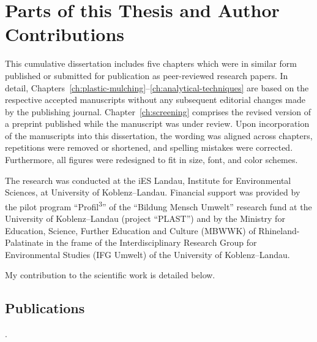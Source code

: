 
\chapter{Parts of this Thesis and Author Contributions}
\label{ch:author-contributions}

This cumulative dissertation includes five chapters which were in similar form published or submitted for publication as peer-reviewed research papers.
In detail, Chapters~\ref{ch:plastic-mulching}--\ref{ch:analytical-techniques} are based on the respective accepted manuscripts without any subsequent editorial changes made by the publishing journal. Chapter~\ref{ch:screening} comprises the revised version of a preprint published while the manuscript was under review.
Upon incorporation of the manuscripts into this dissertation, the wording was aligned across chapters, repetitions were removed or shortened, and spelling mistakes were corrected. Furthermore, all figures were redesigned to fit in size, font, and color schemes.

The research was conducted at the iES Landau, Institute for Environmental Sciences, at University of Koblenz--Landau. Financial support was provided by the pilot program ``Profil\textsuperscript{3}'' of the ``\foreignlanguage{ngerman}{Bildung Mensch Umwelt}'' research fund at the University of Koblenz--Landau (project ``PLAST'') and by the Ministry for Education, Science, Further Education and Culture (MBWWK) of Rhineland-Palatinate in the frame of the Interdisciplinary Research Group for Environmental Studies (\foreignlanguage{ngerman}{IFG Umwelt}) of the University of Koblenz--Landau.

My contribution to the scientific work is detailed below.

\section*{Publications}

\vspace{0.5\baselineskip}
\noindent{}.

